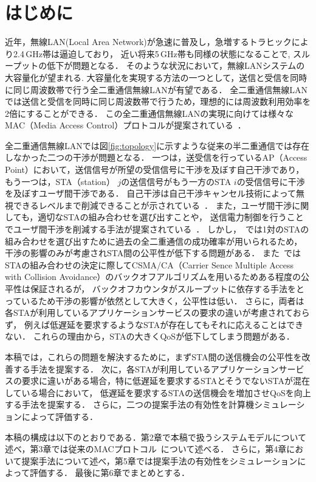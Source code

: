 \documentclass[technicalreport]{ieicej}
\begin{document}

\maketitle

\section{はじめに}
	近年，無線LAN(Local Area Network)が急速に普及し，急増するトラヒックにより2.4\,GHz帯は逼迫しており，
	近い将来5\,GHz帯も同様の状態になることで, スループットの低下が問題となる．
	そのような状況において，無線LANシステムの大容量化が望まれる.
	大容量化を実現する方法の一つとして，送信と受信を同時に同じ周波数帯で行う全二重通信無線LANが有望である．
	全二重通信無線LANでは送信と受信を同時に同じ周波数帯で行うため，理想的には周波数利用効率を2倍にすることができる．
	この全二重通信無線LANの実現に向けては様々なMAC（Media Access Control）プロトコルが提案されている~\cite{fdmac, goyal, janus, fdmac2, morif, fdmac3, fcts}．
	\par
	全二重通信無線LANでは図\ref{fig:topology}に示すような従来の半二重通信では存在しなかった二つの干渉が問題となる．
	一つは，送受信を行っているAP（Access Point）において，送信信号が所望の受信信号に干渉を及ぼす自己干渉であり，
	もう一つは，STA（station） $j$の送信信号がもう一方のSTA $i$の受信信号に干渉を及ぼすユーザ間干渉である．
	自己干渉は自己干渉キャンセル技術によって無視できるレベルまで削減できることが示されている~\cite{fdmac, stanford1}．
	また，ユーザ間干渉に関しても，適切なSTAの組み合わせを選び出すことや，
	送信電力制御を行うことでユーザ間干渉を削減する手法が提案されている~\cite{contra, promac}．
	しかし，~\cite{contra}では1対のSTAの組み合わせを選び出すために過去の全二重通信の成功確率が用いられるため，
	干渉の影響のみが考慮されSTA間の公平性が低下する問題がある．
	また~\cite{promac}ではSTAの組み合わせの決定に際してCSMA/CA（Carrier Sence Multiple Access with Collision Avoidance）のバックオフアルゴリズムを用いるためある程度の公平性は保証されるが，
	バックオフカウンタがスループットに依存する手法をとっているため干渉の影響が依然として大きく，公平性は低い．
	さらに，両者は各STAが利用しているアプリケーションサービスの要求の違いが考慮されておらず，
	例えば低遅延を要求するようなSTAが存在してもそれに応えることはできない．
	これらの理由から，STAの大きくQoSが低下してしまう問題がある．
	\par
	本稿では，これらの問題を解決するために，まずSTA間の送信機会の公平性を改善する手法を提案する．
	次に，各STAが利用しているアプリケーションサービスの要求に違いがある場合，特に低遅延を要求するSTAとそうでないSTAが混在している場合において，
	低遅延を要求するSTAの送信機会を増加させQoSを向上する手法を提案する．
	さらに，二つの提案手法の有効性を計算機シミュレーションによって評価する．
	\par
	本稿の構成は以下のとおりである．第2章で本稿で扱うシステムモデルについて述べ，第3章では従来のMACプロトコル~\cite{promac}について述べる．
	さらに，第4章において提案手法について述べ，第5章では提案手法の有効性をシミュレーションによって評価する．
	最後に第6章でまとめとする．
\end{document}
